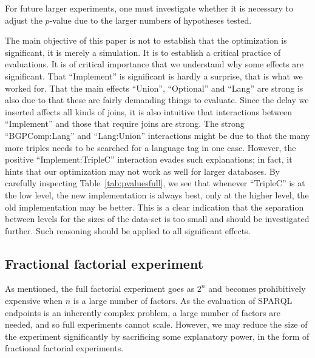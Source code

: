 \documentclass{llncs}
\begin{document}
For future larger experiments, one must investigate whether it is
necessary to adjust the $p$-value due to the larger numbers of
hypotheses tested.

The main objective of this paper is not to establish that the
optimization is significant, it is merely a simulation. It is to
establish a critical practice of evaluations. It is of critical
importance that we understand why some effects are significant. That
``Implement'' is significant is hardly a surprise, that is what we
worked for. That the main effects ``Union'', ``Optional'' and ``Lang''
are strong is also due to that these are fairly demanding things to
evaluate. Since the delay we inserted affects all kinds of joins, it
is also intuitive that interactions between ``Implement'' and those
that require joins are strong. The strong ``BGPComp:Lang'' and
``Lang:Union'' interactions might be due to that the many more triples
needs to be searched for a language tag in one case. However, the
positive ``Implement:TripleC'' interaction evades such explanations;
in fact, it hints that our optimization may not work as well for
larger databases. By carefully inspecting Table~\ref{tab:pvaluesfull},
we see that whenever ``TripleC'' is at the low level, the
new implementation is always best, only at the higher level, the old
implementation may be better. This is a clear indication that the
separation between levels for the sizes of the data-set is too small
and should be investigated further. Such reasoning should be applied
to all significant effects.



\subsection{Fractional factorial experiment}\label{sec:frac}

As mentioned, the full factorial experiment goes as $2^n$ and becomes
prohibitively expensive when $n$ is a large number of factors. As the
evaluation of SPARQL endpoints is an inherently complex problem, a
large number of factors are needed, and so full experiments cannot
scale. However, we may reduce the size of the experiment significantly
by sacrificing some explanatory power, in the form of fractional
factorial experiments.
\end{document}
